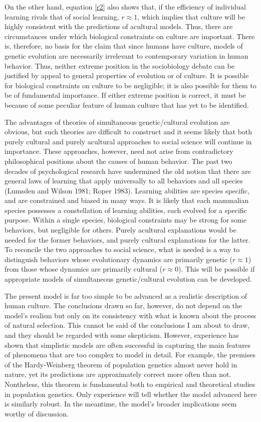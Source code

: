 \documentclass[11pt]{article}
\begin{document}
On the other hand, equation \ref{r2} also shows that, if the
efficiency of individual learning rivals that of social learning,
$r \approx 1$, which implies that culture will be highly consistent with
the predictions of acultural models.  Thus, there are circumstances under
which biological constraints on culture are important.  There
is, therefore, no basis for the claim that since humans have culture,
models of genetic evolution are necessarily irrelevant to contemporary
variation in human behavior.  Thus, neither extreme position in the
sociobiology debate can be justified by appeal to general properties of
evolution or of culture.  It is possible for biological constraints on
culture to be negligible; it is also possible for them to be of
fundamental importance.  If either extreme position is correct, it must be
because of some peculiar feature of human culture that has yet to be
identified.

The advantages of theories of simultaneous genetic/cultural evolution are
obvious, but such theories are difficult to construct and it seems likely
that both purely cultural and purely acultural approaches to social
science will continue in importance.  These approaches, however, need not
arise from contradictory philosophical positions about the causes of human
behavior.  The past two decades of psychological research have undermined
the old notion that there are general laws of learning that apply
universally to all behaviors and all species (Lumsden and Wilson 1981;
Roper 1983).  Learning abilities are species specific, and are constrained
and biased in many ways.  It is likely that each mammalian species
possesses a constellation of learning abilities, each evolved for a
specific purpose.  Within a single species, biological
constraints may be strong for some behaviors, but negligible for others.
Purely acultural explanations would be needed for the former behaviors,
and purely cultural explanations for the latter.  To reconcile the two
approaches to social science, what is needed is a way to
distinguish behaviors whose evolutionary dynamics are primarily genetic
($r \approx 1$) from those whose dynamics are primarily cultural
($r \approx 0$).  This will be possible if appropriate models of
simultaneous genetic/cultural evolution can be developed.

The present model is far too simple to be advanced as a realistic
description of human culture.  The conclusions drawn so far, however, do
not depend on the model's realism but only on its consistency with what is
known about the process of natural selection.  This cannot be said of the
conclusions I am about to draw, and they should be regarded with some
skepticism.  However, experience has shown that simplistic models are
often successful in capturing the main features of phenomena that are too
complex to model in detail.  For example, the premises of the
Hardy-Weinberg theorem of population genetics almost never hold in nature,
yet its predictions are approximately correct more often than not.
Nontheless, this theorem  is
fundamental both to empirical and theoretical studies in population
genetics.  Only experience will tell whether the model advanced here is
similarly robust.  In the meantime, the model's broader implications seem
worthy of discussion.
\end{document}
